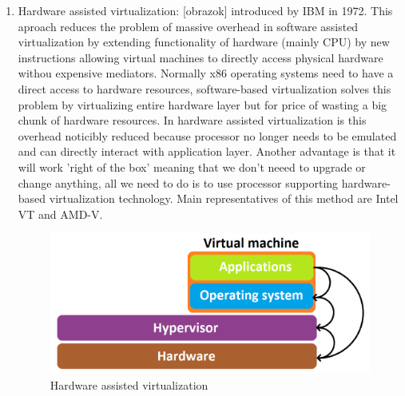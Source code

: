 \begin{enumerate}
\begin{enumerate}
\item Hardware assisted virtualization: [obrazok] introduced by IBM in 1972. This aproach reduces the problem of massive overhead in software assisted virtualization by extending functionality of hardware (mainly CPU) by new instructions allowing virtual machines to directly access physical hardware withou expensive mediators. Normally x86 operating systems need to have a direct access to hardware resources, software-based virtualization solves this problem by virtualizing entire hardware layer but for price of wasting a big chunk of hardware resources. In hardware assisted virtualization is this overhead noticibly reduced because processor no longer needs to be emulated and can directly interact with application layer. Another advantage is that it will work 'right of the box' meaning that we don't neeed to upgrade or change anything, all we need to do is to use processor supporting hardware-based virtualization technology. Main representatives of this method are Intel VT and AMD-V.

\begin{figure}[H]
\centering
\includegraphics[scale=0.45]{hw-assist.png}
\caption{Hardware assisted virtualization}
\end{figure}

\end{enumerate}


\end{enumerate}
